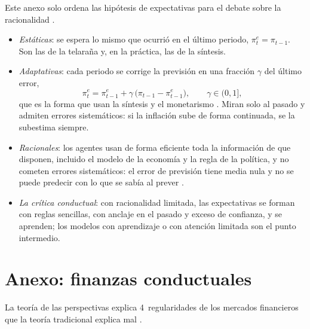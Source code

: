 \documentclass[11pt]{article}
\begin{document}
Este anexo solo ordena las hipótesis de expectativas para el debate sobre la racionalidad  .

\begin{itemize}
\item \emph{Estáticas}: se espera lo mismo que ocurrió en el último periodo, $\pi^e_t=\pi_{t-1}$. Son las de la telaraña y, en la práctica, las de la síntesis.
\item \emph{Adaptativas}: cada periodo se corrige la previsión en una fracción $\gamma$ del último error,
  \begin{equation*}
  \pi^e_t=\pi^e_{t-1}+\gamma\,\big(\pi_{t-1}-\pi^e_{t-1}\big),\qquad \gamma\in(0,1],
  \end{equation*}
  que es la forma que usan la síntesis y el monetarismo . Miran solo al pasado y admiten errores sistemáticos: si la inflación sube de forma continuada, se la subestima siempre.
\item \emph{Racionales}\nocite{Muth1961Rational}: los agentes usan de forma eficiente toda la información de que disponen, incluido el modelo de la economía y la regla de la política, y no cometen errores sistemáticos: el error de previsión tiene media nula y no se puede predecir con lo que se sabía al prever .
\item \emph{La crítica conductual}: con racionalidad limitada, las expectativas se forman con reglas sencillas, con anclaje en el pasado y exceso de confianza, y se aprenden; los modelos con aprendizaje o con atención limitada son el punto intermedio\nocite{Gabaix2020Behavioral}.
\end{itemize}

\section{Anexo: finanzas conductuales}\label{anexo:finanzas}

La teoría de las perspectivas explica 4~regularidades de los mercados financieros que la teoría tradicional explica mal  .
\end{document}
